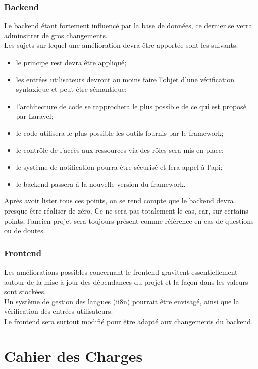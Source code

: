\documentclass[
    iai, %
    il, %
]{heig-tb}
\begin{document}
\subsubsection{Backend}
Le \Gls{backend} étant fortement influencé par la base de données, ce dernier se verra adminsitrer de gros changements.\\
Les sujets sur lequel une amélioration devra être apportée sont les suivants:
\begin{itemize}
    \item le principe \Gls{rest} devra être appliqué;
    \item les entrées utilisateurs devront au moins faire l'objet d'une vérification syntaxique et peut-être sémantique;
    \item l'architecture de code se rapprochera le plus possible de ce qui est proposé par Laravel;
    \item le code utilisera le plus possible les outils fournis par le \Gls{framework};
    \item le contrôle de l'accès aux ressources via des rôles sera mis en place;
    \item le système de notification pourra être sécurisé et fera appel à l'\Gls{api};
    \item le \Gls{backend} passera à la nouvelle version du \Gls{framework}.
\end{itemize}

Après avoir lister tous ces points, on se rend compte que le \Gls{backend} devra presque être réaliser de
zéro. Ce ne sera pas totalement le cas, car, sur certains points, l'ancien projet sera toujours
présent comme référence en cas de questions ou de doutes.

\subsubsection{Frontend}
Les améliorations possibles concernant le \Gls{frontend} gravitent essentiellement autour de la mise à jour des dépendances du projet et la façon dans les valeurs sont stockées.\\
Un système de gestion des langues (ii8n) pourrait être envisagé, ainsi que la vérification des entrées utilisateurs.\\
Le \Gls{frontend} sera surtout modifié pour être adapté aux changements du \Gls{backend}.

\section{Cahier des Charges}
\end{document}

